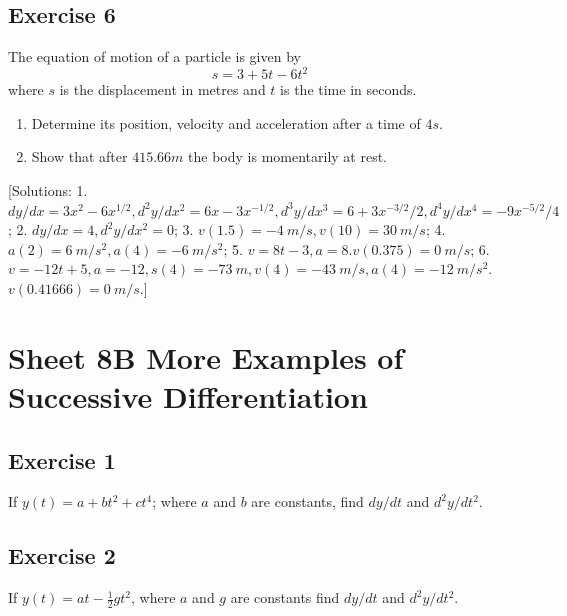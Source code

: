 \documentclass[
  11pt,
  oneside]{book}
\providecommand{\tightlist}{%
  \setlength{\itemsep}{0pt}\setlength{\parskip}{0pt}}
\newcommand{\slide}{}
\theoremstyle{definition}
\theoremstyle{definition}
\theoremstyle{definition}
\theoremstyle{definition}
\theoremstyle{remark}
\begin{document}
\subsection*{Exercise 6}\label{exercise-6}

The equation of motion of a particle is given by
\[
s=3+5t-6t^2
\]
where \(s\) is the displacement in metres and \(t\) is the time in seconds.

\begin{enumerate}
\def\labelenumi{\alph{enumi}.}
\tightlist
\item
  Determine its position, velocity and acceleration after a time of \(4s\).
\item
  Show that after \(415.66m\) the body is momentarily at rest.
\end{enumerate}

{[}Solutions: 1. \(dy/dx=3x^2-6x^{1/2}, d^2y/dx^2=6x-3x^{-1/2}, d^3y/dx^3=6+3x^{-3/2}/2, d^4y/dx^4=-9x^{-5/2}/4\); 2. \(dy/dx=4, d^2y/dx^2=0\); 3. \(v(1.5) = -4\ m/s, v(10) = 30\ m/s\); 4. \(a(2) = 6\ m/s^2, a(4) = -6\ m/s^2\); 5. \(v=8t-3, a=8. v(0.375)=0\ m/s\); 6. \(v = -12t+5, a=-12, s(4) = -73\ m, v(4)=-43\ m/s, a(4)=-12\ m/s^2\). \(v(0.41666)=0\ m/s\).{]}
\slide

\section{Sheet 8B More Examples of Successive Differentiation}\label{sheet-8b-more-examples-of-successive-differentiation}

\subsection*{Exercise 1}\label{exercise-1-3}

If \(y(t) = a + bt^2 + ct^4\); where \(a\) and \(b\) are constants, find \(dy/dt\) and \(d^2y/dt^2\).

\slide

\subsection*{Exercise 2}\label{exercise-2-3}

If \(y(t) = at -\frac 12gt^2\), where \(a\) and \(g\) are constants find \(dy/dt\) and \(d^2y/dt^2\).

\slide
\end{document}
